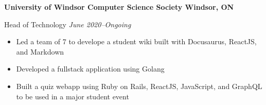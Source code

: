\textbf{University of Windsor Computer Science Society \hfill Windsor, ON}

Head of Technology \hfill \textit{June 2020--Ongoing}
\begin{itemize}
    \item Led a team of 7 to develope a student wiki built with Docusaurus, ReactJS, and Markdown
    \item Developed a fullstack application using Golang
    \item Built a quiz webapp using Ruby on Rails, ReactJS, JavaScript, and GraphQL to be used in a major student event
\end{itemize}
